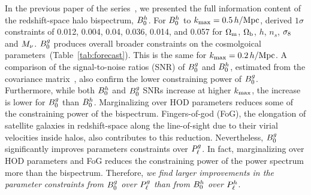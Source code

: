 

In the previous paper of the series~\citep{hahn2020}, we presented the full
information content of the redshift-space halo bispectrum, $B^h_0$. For $B^h_0$ to
$k_{\rm max}=0.5\,h/\mathrm{Mpc}$, \cite{hahn2020} derived $1\sigma$ constraints of 
0.012, 0.004, 0.04, 0.036, 0.014, and 0.057 
for $\Omega_{\rm m}$, $\Omega_{\rm b}$, $h$, $n_s$, $\sigma_8$ and $M_\nu$. 
$B^g_0$ produces overall broader constraints on the cosmolgoical parameters~(Table~\ref{tab:forecast}). This
is the same for $k_{\rm max}=0.2\,h/\mathrm{Mpc}$. A comparison of the signal-to-noise ratios
(SNR) of $B^g_0$ and $B^h_0$, estimated from the covariance
matrix~\citep[\eg][]{sefusatti2005,sefusatti2006,chan2017}, also confirm the lower
constraining power of $B^g_0$. Furthermore, while both $B^h_0$ and $B^g_0$ SNRs increase 
at higher $k_{\rm max}$, the increase is lower for $B^g_0$ than $B^h_0$.
Marginalizing over HOD parameters reduces some of the constraining power of 
the bispectrum. Fingers-of-god (FoG), the elongation of satellite galaxies
in redshift-space along the line-of-sight due to their virial velocities inside 
halos, also contributes to this reduction. 
Nevertheless, $B^g_0$ significantly improves parameters constraints over $P^g_{\ell}$.
In fact, marginalizing over HOD parameters and FoG reduces the constraining
power of the power spectrum more than the bispectrum. Therefore, {\em we find 
larger improvements in the parameter constraints from $B^g_0$ over $P^g_{\ell}$ than
from $B^h_0$ over $P^h_{\ell}$}.

